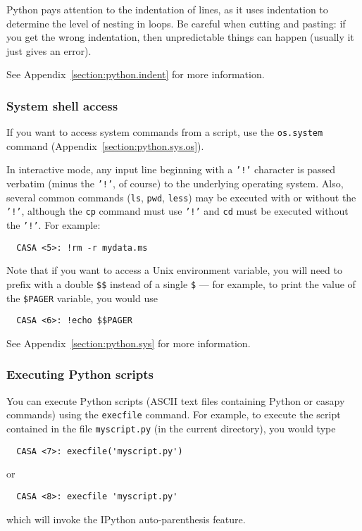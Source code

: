Python pays attention to the indentation of lines, as it
uses indentation to determine the level
of nesting in loops.  Be careful when cutting and pasting: if you
get the wrong indentation, then unpredictable things can happen
(usually it just gives an error).  

See Appendix~\ref{section:python.indent} for more information.

\subsubsection{System shell access}
\label{section:intro.basics.python.sys}

If you want to access system commands from a script, use the
{\tt os.system} command (Appendix~\ref{section:python.sys.os}).

In interactive mode, any input line beginning with a {\tt '!'} 
character is passed verbatim (minus the {\tt '!'}, of course) to the
underlying operating system. Also, several common commands ({\tt ls},
{\tt pwd}, {\tt less}) may be executed with or without the {\tt '!'},
although the {\tt cp} command must use {\tt '!'} and
{\tt cd} must be executed without the {\tt '!'}. 
For example:
\small
\begin{verbatim}
  CASA <5>: !rm -r mydata.ms
\end{verbatim}
\normalsize

Note that if you want to access a Unix environment variable, you
will need to prefix with a double {\tt \$\$} instead of a single
{\tt \$} --- for example, to print the value of the {\tt \$PAGER}
variable, you would use
\small
\begin{verbatim}
  CASA <6>: !echo $$PAGER
\end{verbatim}
\normalsize

See Appendix~\ref{section:python.sys} for more information.

\subsubsection{Executing Python scripts}
\label{section:intro.basics.python.execfile}

You can execute Python scripts (ASCII text files containing 
Python or casapy commands) using the {\tt execfile} command.
For example, to execute the script contained in the file
{\tt myscript.py} (in the current directory), you would type
\small
\begin{verbatim}
  CASA <7>: execfile('myscript.py')
\end{verbatim}
\normalsize
or
\small
\begin{verbatim}
  CASA <8>: execfile 'myscript.py'
\end{verbatim}
\normalsize
which will invoke the IPython auto-parenthesis feature.

